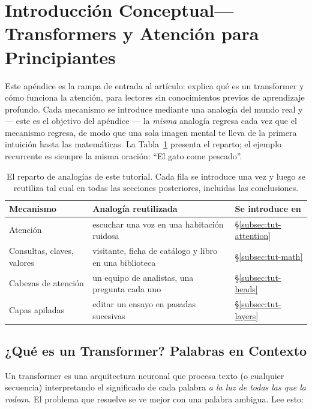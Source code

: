 \section{Introducción Conceptual---Transformers y Atención para Principiantes}
\label{sec:annex-tutorial}

Este apéndice es la rampa de entrada al artículo: explica qué es un transformer y cómo funciona la atención, para lectores sin conocimientos previos de aprendizaje profundo. Cada mecanismo se introduce mediante una analogía del mundo real y --- este es el objetivo del apéndice --- la \emph{misma} analogía regresa cada vez que el mecanismo regresa, de modo que una sola imagen mental te lleva de la primera intuición hasta las matemáticas. La Tabla~\ref{tab:tut-analogies} presenta el reparto; el ejemplo recurrente es siempre la misma oración: ``El gato come pescado''.

\begin{table}[H]
\centering
\small
\begin{tabular}{@{}lll@{}}
\toprule
\textbf{Mecanismo} & \textbf{Analogía reutilizada} & \textbf{Se introduce en}\\
\midrule
Atención & escuchar una voz en una habitación ruidosa & \S\ref{subsec:tut-attention}\\
Consultas, claves, valores & visitante, ficha de catálogo y libro en una biblioteca & \S\ref{subsec:tut-math}\\
Cabezas de atención & un equipo de analistas, una pregunta cada uno & \S\ref{subsec:tut-heads}\\
Capas apiladas & editar un ensayo en pasadas sucesivas & \S\ref{subsec:tut-layers}\\
\bottomrule
\end{tabular}
\caption{El reparto de analogías de este tutorial. Cada fila se introduce una vez y luego se reutiliza tal cual en todas las secciones posteriores, incluidas las conclusiones.}
\label{tab:tut-analogies}
\end{table}

\subsection{¿Qué es un Transformer? Palabras en Contexto}
\label{subsec:tut-context}

Un transformer es una arquitectura neuronal que procesa texto (o cualquier secuencia) interpretando el significado de cada palabra \emph{a la luz de todas las que la rodean}. El problema que resuelve se ve mejor con una palabra ambigua. Lee esto:


